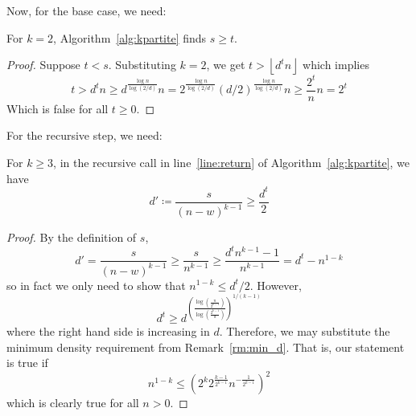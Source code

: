 Now, for the base case, we need:

\begin{lemma}\label{lm:base_case}
    For $k=2$, Algorithm~\ref{alg:kpartite} finds $s \geq t$.
    \begin{proof}
        Suppose $t < s$.
        Substituting $k=2$, we get $t > \left\lfloor d^t n \right\rfloor$ which implies
        \[
            t >
            d^t n \geq
            d^{\frac{\log n}{\log (2/d)}} n =
            2^{\frac{\log n}{\log (2/d)}}(d/2)^{\frac{\log n}{\log (2/d)}} n \geq
            \frac{2^t}{n} n =
            2^t
        \]
        Which is false for all $t \geq 0$.
    \end{proof} %
\end{lemma}

For the recursive step, we need:

\begin{lemma}\label{lm:d_t}
    For $k \geq 3$, in the recursive call in line~\ref{line:return} of Algorithm~\ref{alg:kpartite},
    we have
    \[
        d' \coloneqq \frac{s}{(n-w)^{k-1}} \geq \frac{d^t}{2}
    \]

    \begin{proof}
        By the definition of $s$,
        \[
            d' =
            \frac{s}{(n-w)^{k-1}} \geq
            \frac{s}{n^{k-1}} \geq
            \frac{d^t n^{k-1} - 1 }{n^{k-1}} =
            d^t - n^{1-k}
        \]
        so in fact we only need to show that $n^{1-k} \leq d^t/2$.
        However,
        \[
            d^t \geq
            d^{\left( \frac{\log \left(\frac{n}{2^{k-1}}\right)}{\log \left(\frac{2^{k-1}}{d}\right)} \right)^{1/(k-1)}}
        \]
        where the right hand side is increasing in $d$.
        Therefore, we may substitute the minimum density requirement from Remark~\ref{rm:min_d}.
        That is, our statement is true if
        \[
            n^{1-k} \leq \left(2^{k} 2^{\frac{k - 1}{2^{k-1}}} n^{-\frac{1}{2^{k-1}}}\right)^2
        \]
        which is clearly true for all $n > 0$.
    \end{proof}

\end{lemma}

